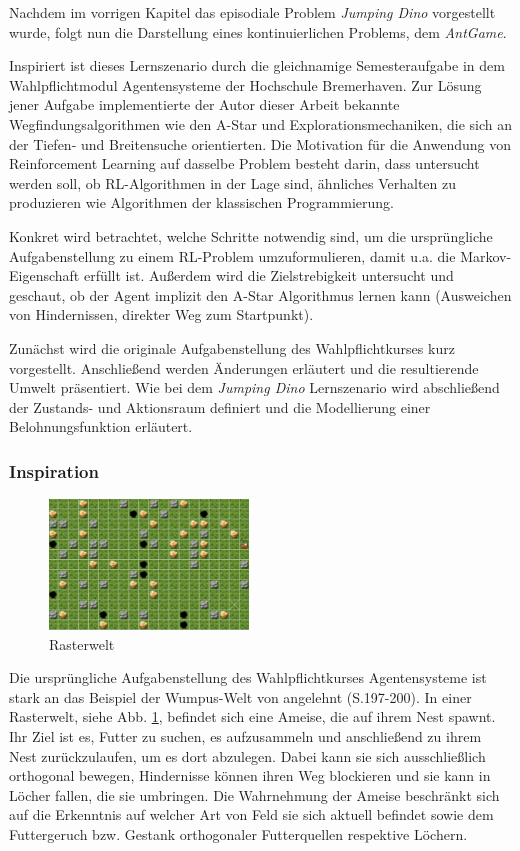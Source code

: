 Nachdem im vorrigen Kapitel das episodiale Problem \textit{Jumping Dino} vorgestellt wurde, folgt nun die Darstellung eines kontinuierlichen Problems, dem \textit{AntGame}.
\par 
Inspiriert ist dieses Lernszenario durch die gleichnamige Semesteraufgabe in dem Wahlpflichtmodul \glqq Agentensysteme\grqq{} der Hochschule Bremerhaven. Zur Lösung jener Aufgabe implementierte der Autor dieser Arbeit bekannte Wegfindungsalgorithmen wie den A-Star und Explorationsmechaniken, die sich an der Tiefen- und Breitensuche orientierten. Die  Motivation für die Anwendung von Reinforcement Learning auf dasselbe Problem besteht darin, dass untersucht werden soll, ob RL-Algorithmen in der Lage sind, ähnliches Verhalten zu produzieren wie Algorithmen der klassischen Programmierung.
\par 
Konkret wird betrachtet, welche Schritte notwendig sind, um die ursprüngliche Aufgabenstellung zu einem RL-Problem umzuformulieren, damit u.a. die Markov-Eigenschaft erfüllt ist. Außerdem wird die Zielstrebigkeit untersucht und geschaut, ob der Agent implizit den A-Star Algorithmus lernen kann (Ausweichen von Hindernissen, direkter Weg zum Startpunkt).
\par 
Zunächst wird die originale Aufgabenstellung des Wahlpflichtkurses kurz vorgestellt. Anschließend werden Änderungen erläutert und die resultierende Umwelt präsentiert. Wie bei dem \textit{Jumping Dino} Lernszenario wird abschließend der Zustands- und Aktionsraum definiert und die Modellierung einer Belohnungsfunktion erläutert.

\subsubsection{Inspiration}
\begin{figure}
    \begin{center}
    \includegraphics[width=200px]{images/rasterwelt.png}  \end{center}
    \caption{Rasterwelt}
    \label{fig:rasterwelt}
  \end{figure}
Die ursprüngliche Aufgabenstellung des Wahlpflichtkurses \glqq Agentensysteme\grqq{} ist stark an das Beispiel der \glqq Wumpus-Welt\grqq{} von \cite{wumpus} angelehnt (S.197-200). In einer Rasterwelt, siehe Abb. \ref{fig:rasterwelt}, befindet sich eine Ameise, die auf ihrem Nest spawnt. Ihr Ziel ist es, Futter zu suchen, es aufzusammeln und anschließend zu ihrem Nest zurückzulaufen, um es dort abzulegen. Dabei kann sie sich ausschließlich orthogonal bewegen, Hindernisse können ihren Weg blockieren und sie kann in Löcher fallen, die sie umbringen. Die Wahrnehmung der Ameise beschränkt sich auf die Erkenntnis auf welcher Art von Feld sie sich aktuell befindet sowie dem Futtergeruch bzw. Gestank orthogonaler Futterquellen respektive Löchern. 

